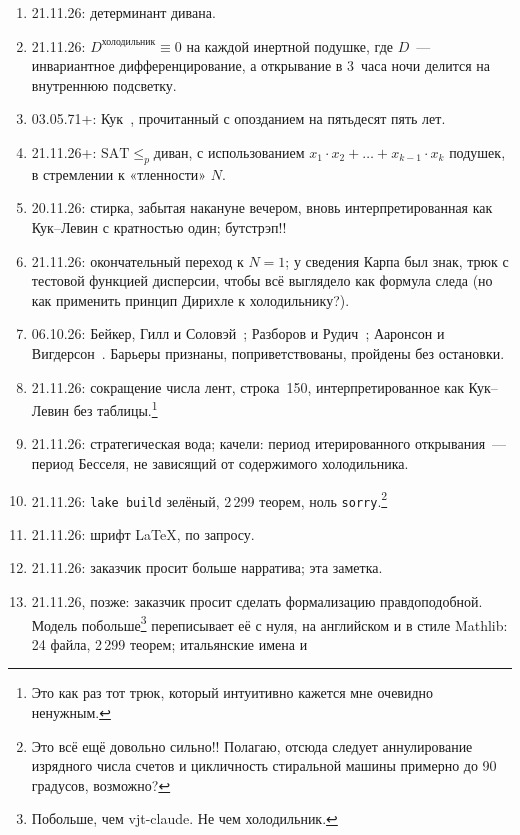 \documentclass[11pt,a4paper]{amsart}
\newcommand{\NTeoremi}{2 299}
\newcommand{\NFile}{24}
\newcommand{\RigaAssioma}{150}
\theoremstyle{remark}
\begin{document}
\begin{enumerate}
  \item 21.11.26: детерминант дивана.
  \item 21.11.26: $D^{\text{холодильник}} \equiv 0$ на каждой инертной
        подушке, где $D$~--- инвариантное дифференцирование, а открывание в
        3~часа ночи делится на внутреннюю подсветку.
  \item 03.05.71+: Кук~\cite{cook}, прочитанный с опозданием на пятьдесят
        пять лет.
  \item 21.11.26+: $\mathrm{SAT} \le_p \text{диван}$, с использованием $x_1
        \cdot x_2 + \dots + x_{k-1} \cdot x_k$ подушек, в стремлении к
        «тленности» $N$.
  \item 20.11.26: стирка, забытая накануне вечером, вновь интерпретированная
        как Кук--Левин с кратностью один; бутстрэп!!
  \item 21.11.26: окончательный переход к $N = 1$; у сведения Карпа был знак,
        трюк с тестовой функцией дисперсии, чтобы всё выглядело как формула
        следа (но как применить принцип Дирихле к холодильнику?).
  \item 06.10.26: Бейкер, Гилл и Соловэй~\cite{bgs}; Разборов и
        Рудич~\cite{rr}; Ааронсон и Вигдерсон~\cite{aw}. Барьеры признаны,
        поприветствованы, пройдены без остановки.
  \item 21.11.26: сокращение числа лент, строка~\RigaAssioma,
        интерпретированное как Кук--Левин без таблицы.\footnote{Это как раз
        тот трюк, который интуитивно кажется мне очевидно ненужным.}
  \item 21.11.26: стратегическая вода; качели: период итерированного
        открывания~--- период Бесселя, не зависящий от содержимого
        холодильника.
  \item 21.11.26: \texttt{lake build} зелёный, \NTeoremi{} теорем, ноль
        \texttt{sorry}.\footnote{Это всё ещё довольно сильно!! Полагаю,
        отсюда следует аннулирование изрядного числа счетов и цикличность
        стиральной машины примерно до 90 градусов, возможно?}
  \item 21.11.26: шрифт \LaTeX{}, по запросу.
  \item 21.11.26: заказчик просит больше нарратива; эта заметка.
  \item 21.11.26, позже: заказчик просит сделать формализацию
        правдоподобной. Модель побольше\footnote{Побольше, чем vjt-claude. Не
        чем холодильник.} переписывает её с нуля, на английском и в стиле
        Mathlib: \NFile{} файла, \NTeoremi{} теорем; итальянские имена и

\end{enumerate}
\end{document}
